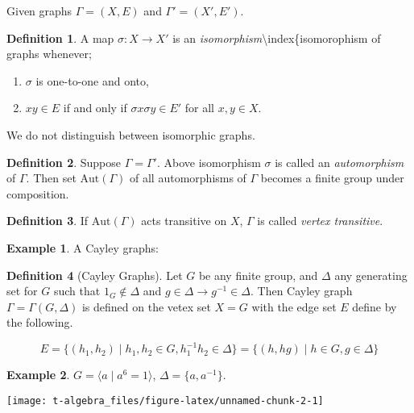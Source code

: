 \documentclass[
]{book}
\providecommand{\tightlist}{%
  \setlength{\itemsep}{0pt}\setlength{\parskip}{0pt}}
\theoremstyle{definition}
\newtheorem{definition}{Definition}[chapter]
\theoremstyle{definition}
\newtheorem{example}{Example}[chapter]
\theoremstyle{definition}
\theoremstyle{definition}
\theoremstyle{remark}
\begin{document}
Given graphs \(\Gamma = (X, E)\) and \(\Gamma' = (X', E')\).

\begin{definition}

A map \(\sigma: X \to X'\) is an \emph{isomorphism}\textbackslash index\{isomorophism of graphs whenever;

\begin{enumerate}
\def\labelenumi{\roman{enumi}.}
\tightlist
\item
  \(\sigma\) is one-to-one and onto,
\item
  \(xy\in E\) if and only if \(\sigma x \sigma y \in E'\) for all \(x, y\in X\).
\end{enumerate}

\end{definition}

We do not distinguish between isomorphic graphs.

\begin{definition}
Suppose \(\Gamma = \Gamma'\). Above isomorphism \(\sigma\) is called an \emph{automorphism} of \(\Gamma\). Then set \(\mathrm{Aut}(\Gamma)\) of all automorphisms of \(\Gamma\) becomes a finite group under composition.
\end{definition}

\begin{definition}
If \(\mathrm{Aut}(\Gamma)\) acts transitive on \(X\), \(\Gamma\) is called \emph{vertex transitive}.
\end{definition}

\begin{example}
A Cayley graphs:
\end{example}

\begin{definition}[Cayley Graphs]
\protect\hypertarget{def:cayley}{}\label{def:cayley}Let \(G\) be any finite group, and \(\Delta\) any generating set for \(G\) such that \(1_G \not\in \Delta\) and \(g\in \Delta \to g^{-1}\in \Delta\).
Then Cayley graph \(\Gamma = \Gamma(G, \Delta)\) is defined on the vetex set \(X = G\) with the edge set \(E\) define by the following. 

\[E = \{(h_1,h_2)\mid h_1, h_2\in G, h_1^{-1}h_2\in \Delta\} = \{(h, hg) \mid h\in G, g\in \Delta\}\]
\end{definition}

\begin{example}

\(G = \langle a \mid a^6 = 1\rangle\), \(\Delta = \{a, a^{-1}\}\).

\begin{center}\texttt{[image: t-algebra\_files/figure-latex/unnamed-chunk-2-1]} \end{center}

\end{example}
\end{document}
